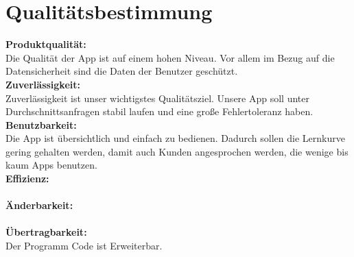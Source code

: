 \section{Qualitätsbestimmung}
\textbf{Produktqualität:}\\ %
Die Qualität der App ist auf einem hohen Niveau. Vor allem im Bezug auf die Datensicherheit sind die Daten der Benutzer geschützt.\\
\textbf{Zuverlässigkeit:}\\%
Zuverlässigkeit ist unser wichtigstes Qualitätsziel. Unsere App soll unter Durchschnittsanfragen stabil laufen und eine große Fehlertoleranz haben. \\
\textbf{Benutzbarkeit:}\\ %
Die App ist übersichtlich und einfach zu bedienen. Dadurch sollen die Lernkurve gering gehalten werden, damit auch Kunden angesprochen werden, die wenige bis kaum Apps benutzen.\\
\textbf{Effizienz:}\\ %
\\
\textbf{Änderbarkeit:}\\ %
\\
\textbf{Übertragbarkeit:}\\%
Der Programm Code ist Erweiterbar.\\